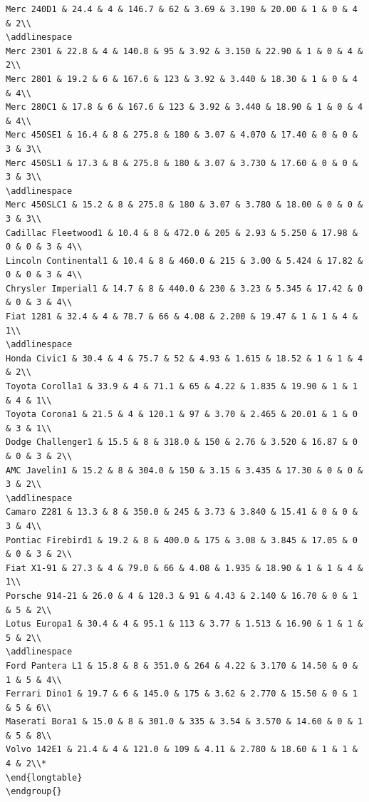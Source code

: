 \documentclass[a4paper, nobind]{templates/ociamthesis}
\begin{document}
\begin{verbatim}
Merc 240D1 & 24.4 & 4 & 146.7 & 62 & 3.69 & 3.190 & 20.00 & 1 & 0 & 4 & 2\\
\addlinespace
Merc 2301 & 22.8 & 4 & 140.8 & 95 & 3.92 & 3.150 & 22.90 & 1 & 0 & 4 & 2\\
Merc 2801 & 19.2 & 6 & 167.6 & 123 & 3.92 & 3.440 & 18.30 & 1 & 0 & 4 & 4\\
Merc 280C1 & 17.8 & 6 & 167.6 & 123 & 3.92 & 3.440 & 18.90 & 1 & 0 & 4 & 4\\
Merc 450SE1 & 16.4 & 8 & 275.8 & 180 & 3.07 & 4.070 & 17.40 & 0 & 0 & 3 & 3\\
Merc 450SL1 & 17.3 & 8 & 275.8 & 180 & 3.07 & 3.730 & 17.60 & 0 & 0 & 3 & 3\\
\addlinespace
Merc 450SLC1 & 15.2 & 8 & 275.8 & 180 & 3.07 & 3.780 & 18.00 & 0 & 0 & 3 & 3\\
Cadillac Fleetwood1 & 10.4 & 8 & 472.0 & 205 & 2.93 & 5.250 & 17.98 & 0 & 0 & 3 & 4\\
Lincoln Continental1 & 10.4 & 8 & 460.0 & 215 & 3.00 & 5.424 & 17.82 & 0 & 0 & 3 & 4\\
Chrysler Imperial1 & 14.7 & 8 & 440.0 & 230 & 3.23 & 5.345 & 17.42 & 0 & 0 & 3 & 4\\
Fiat 1281 & 32.4 & 4 & 78.7 & 66 & 4.08 & 2.200 & 19.47 & 1 & 1 & 4 & 1\\
\addlinespace
Honda Civic1 & 30.4 & 4 & 75.7 & 52 & 4.93 & 1.615 & 18.52 & 1 & 1 & 4 & 2\\
Toyota Corolla1 & 33.9 & 4 & 71.1 & 65 & 4.22 & 1.835 & 19.90 & 1 & 1 & 4 & 1\\
Toyota Corona1 & 21.5 & 4 & 120.1 & 97 & 3.70 & 2.465 & 20.01 & 1 & 0 & 3 & 1\\
Dodge Challenger1 & 15.5 & 8 & 318.0 & 150 & 2.76 & 3.520 & 16.87 & 0 & 0 & 3 & 2\\
AMC Javelin1 & 15.2 & 8 & 304.0 & 150 & 3.15 & 3.435 & 17.30 & 0 & 0 & 3 & 2\\
\addlinespace
Camaro Z281 & 13.3 & 8 & 350.0 & 245 & 3.73 & 3.840 & 15.41 & 0 & 0 & 3 & 4\\
Pontiac Firebird1 & 19.2 & 8 & 400.0 & 175 & 3.08 & 3.845 & 17.05 & 0 & 0 & 3 & 2\\
Fiat X1-91 & 27.3 & 4 & 79.0 & 66 & 4.08 & 1.935 & 18.90 & 1 & 1 & 4 & 1\\
Porsche 914-21 & 26.0 & 4 & 120.3 & 91 & 4.43 & 2.140 & 16.70 & 0 & 1 & 5 & 2\\
Lotus Europa1 & 30.4 & 4 & 95.1 & 113 & 3.77 & 1.513 & 16.90 & 1 & 1 & 5 & 2\\
\addlinespace
Ford Pantera L1 & 15.8 & 8 & 351.0 & 264 & 4.22 & 3.170 & 14.50 & 0 & 1 & 5 & 4\\
Ferrari Dino1 & 19.7 & 6 & 145.0 & 175 & 3.62 & 2.770 & 15.50 & 0 & 1 & 5 & 6\\
Maserati Bora1 & 15.0 & 8 & 301.0 & 335 & 3.54 & 3.570 & 14.60 & 0 & 1 & 5 & 8\\
Volvo 142E1 & 21.4 & 4 & 121.0 & 109 & 4.11 & 2.780 & 18.60 & 1 & 1 & 4 & 2\\*
\end{longtable}
\endgroup{}


\end{verbatim}
\end{document}

